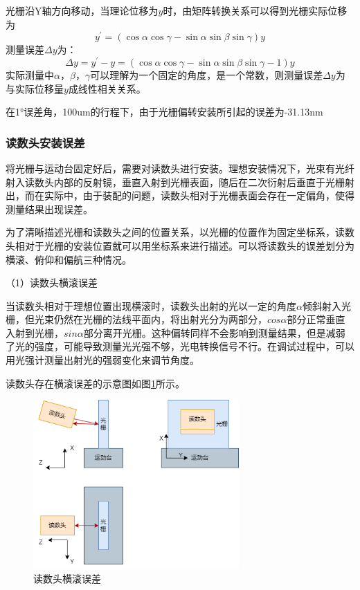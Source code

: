 \documentclass[type=master,oneside]{fduthesis}
\begin{document}
光栅沿Y轴方向移动，当理论位移为$y$时，由矩阵转换关系可以得到光栅实际位移为
\begin{equation}
  y^{\prime}=(\cos \alpha \cos \gamma-\sin \alpha \sin \beta \sin \gamma) y
\end{equation}
测量误差$\Delta y$为：
\begin{equation}
  \Delta y=y^{\prime}-y=(\cos \alpha \cos \gamma-\sin \alpha \sin \beta \sin \gamma-1) y
\end{equation}
实际测量中$\alpha $，$\beta $，$\gamma $可以理解为一个固定的角度，是一个常数，则测量误差$\Delta y$为与实际位移量$y$成线性相关关系。

在1°误差角，100um的行程下，由于光栅偏转安装所引起的误差为-31.13nm

\subsubsection{读数头安装误差}
将光栅与运动台固定好后，需要对读数头进行安装。理想安装情况下，光束有光纤射入读数头内部的反射镜，垂直入射到光栅表面，随后在二次衍射后垂直于光栅射出，而在实际中，由于装配的问题，读数头相对于光栅表面会存在一定偏角，使得测量结果出现误差。

为了清晰描述光栅和读数头之间的位置关系，以光栅的位置作为固定坐标系，读数头相对于光栅的安装位置就可以用坐标系来进行描述。可以将读数头的误差划分为横滚、俯仰和偏航三种情况。

（1）读数头横滚误差

当读数头相对于理想位置出现横滚时，读数头出射的光以一定的角度$\alpha $倾斜射入光栅，但光束仍然在光栅的法线平面内，将出射光分为两部分，$cos \alpha $部分正常垂直入射到光栅，$sin\alpha $部分离开光栅。这种偏转同样不会影响到测量结果，但是减弱了光的强度，可能导致测量光光强不够，光电转换信号不行。在调试过程中，可以用光强计测量出射光的强弱变化来调节角度。

读数头存在横滚误差的示意图如图\ref{fig:读数头横滚误差三视图}所示。
\begin{figure}[H]
  \centering
  \includegraphics[width=0.7\textwidth]{4-fig//读数头横滚误差.png}
  \caption{读数头横滚误差}
  \label{fig:读数头横滚误差三视图}
\end{figure}
\end{document}
